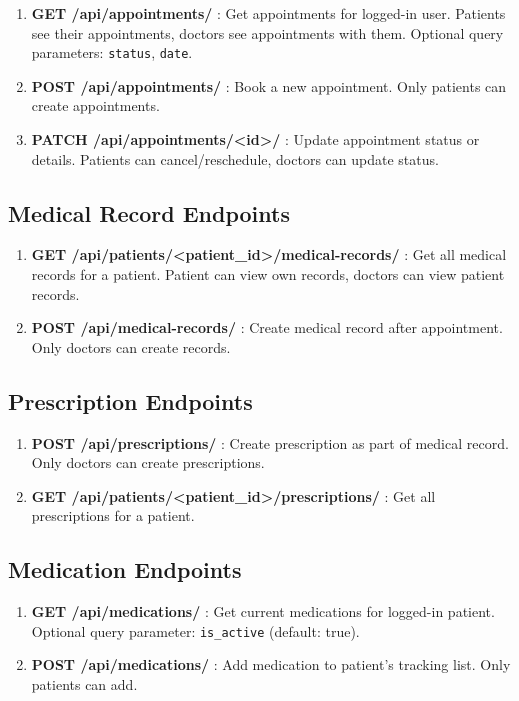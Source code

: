 \documentclass[11pt,a4paper]{article}
\begin{document}
\begin{enumerate}
    \item \textbf{GET /api/appointments/} : Get appointments for logged-in user. Patients see their appointments, doctors see appointments with them. Optional query parameters: \texttt{status}, \texttt{date}.
    \item \textbf{POST /api/appointments/} : Book a new appointment. Only patients can create appointments.
    \item \textbf{PATCH /api/appointments/<id>/} : Update appointment status or details. Patients can cancel/reschedule, doctors can update status.
\end{enumerate}

\subsection{Medical Record Endpoints}

\begin{enumerate}
    \item \textbf{GET /api/patients/<patient\_id>/medical-records/} : Get all medical records for a patient. Patient can view own records, doctors can view patient records.
    \item \textbf{POST /api/medical-records/} : Create medical record after appointment. Only doctors can create records.
\end{enumerate}

\subsection{Prescription Endpoints}

\begin{enumerate}
    \item \textbf{POST /api/prescriptions/} : Create prescription as part of medical record. Only doctors can create prescriptions.
    \item \textbf{GET /api/patients/<patient\_id>/prescriptions/} : Get all prescriptions for a patient.
\end{enumerate}

\subsection{Medication Endpoints}

\begin{enumerate}
    \item \textbf{GET /api/medications/} : Get current medications for logged-in patient. Optional query parameter: \texttt{is\_active} (default: true).
    \item \textbf{POST /api/medications/} : Add medication to patient's tracking list. Only patients can add.
\end{enumerate}
\end{document}
